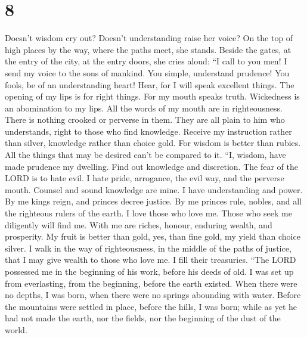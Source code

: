 \hypertarget{section-7}{%
\section{8}\label{section-7}}

 Doesn't wisdom cry out? Doesn't understanding raise her
voice?  On the top of high places by the way, where the
paths meet, she stands.  Beside the gates, at the entry of
the city, at the entry doors, she cries aloud:  ``I call
to you men! I send my voice to the sons of mankind.  You
simple, understand prudence! You fools, be of an understanding heart!
 Hear, for I will speak excellent things. The opening of
my lips is for right things.  For my mouth speaks truth.
Wickedness is an abomination to my lips.  All the words of
my mouth are in righteousness. There is nothing crooked or perverse in
them.  They are all plain to him who understands, right to
those who find knowledge.  Receive my instruction rather
than silver, knowledge rather than choice gold.  For
wisdom is better than rubies. All the things that may be desired can't
be compared to it.  ``I, wisdom, have made prudence my
dwelling. Find out knowledge and discretion.  The fear of
the LORD is to hate evil. I hate pride, arrogance, the evil way, and the
perverse mouth.  Counsel and sound knowledge are mine. I
have understanding and power.  By me kings reign, and
princes decree justice.  By me princes rule, nobles, and
all the righteous rulers of the earth.  I love those who
love me. Those who seek me diligently will find me.  With
me are riches, honour, enduring wealth, and prosperity. 
My fruit is better than gold, yes, than fine gold, my yield than choice
silver.  I walk in the way of righteousness, in the
middle of the paths of justice,  that I may give wealth
to those who love me. I fill their treasuries.  ``The
LORD possessed me in the beginning of his work, before his deeds of old.
 I was set up from everlasting, from the beginning,
before the earth existed.  When there were no depths, I
was born, when there were no springs abounding with water.
 Before the mountains were settled in place, before the
hills, I was born;  while as yet he had not made the
earth, nor the fields, nor the beginning of the dust of the world.
